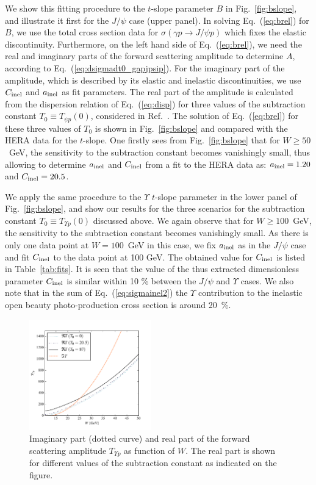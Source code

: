\documentclass[prd,amsmath,%
twocolumn,floatfix,amssymb, preprintnumbers, linenumbers,nofootinbib, superscriptaddress]{revtex4}
\begin{document}
We show this fitting procedure to the $t$-slope parameter $B$ in Fig.~\ref{fig:bslope}, and illustrate it first for the $J/\psi$ case (upper panel). In solving Eq.~(\ref{eq:brel}) for $B$, 
we use the total cross section data for 
$\sigma(\gamma p \to J/\psi p)$ which fixes the elastic discontinuity. Furthermore, on the left hand side of Eq.~(\ref{eq:brel}), we need the real and imaginary parts of the forward scattering amplitude to determine $A$, according to Eq.~(\ref{eq:dsigmadt0_gapjpsip}). 
For the imaginary part of the amplitude, which is described by its elastic and inelastic discontinuities, we use $C_{\rm inel}$ and $a_{\rm inel}$ as fit parameters.   
The real part of the amplitude is calculated from the dispersion relation of Eq.~(\ref{eq:disp}) for three values of the subtraction constant $T_0 \equiv T_{\psi p}(0)$, considered in Ref.~\cite{Gryniuk:2016mpk}. The solution of Eq.~(\ref{eq:brel}) for these three values of $T_0$ is shown in Fig.~\ref{fig:bslope} and compared with the HERA data for the $t$-slope. One firstly sees from Fig.~\ref{fig:bslope} that for $W \geq 50$~GeV, the sensitivity to the subtraction constant becomes vanishingly small, thus allowing to determine $a_{\rm inel}$ and $C_{\rm inel}$ from a fit to the HERA data as: $a_{\rm inel} = 1.20$ and 
$C_{\rm inel} = 20.5$. 


We apply the same procedure to the $\Upsilon$ $t$-slope parameter in the lower panel of Fig.~\ref{fig:bslope}, and  show our results for the three scenarios for the subtraction constant $T_0 \equiv T_{\Upsilon p}(0)$ discussed above. We again observe that for $W \geq 100$~GeV, the sensitivity to the subtraction constant becomes vanishingly small. 
As there is only one data point at $W = 100$~GeV in this case, we fix $a_{\rm inel}$ as in the $J/\psi$ case and fit $C_{\rm inel}$ to the data point at 100 GeV. The obtained value for $C_{\rm inel}$ is listed in Table~\ref{tab:fits}. It is seen that the value of the thus extracted dimensionless parameter $C_{\rm inel}$ is similar within 10 \% between the $J/\psi$ and $\Upsilon$ cases. We also note that in the sum of Eq.~(\ref{eq:sigmainel2}) the $\Upsilon$ contribution  to the inelastic open beauty photo-production cross section is around 20~\%. 

\begin{figure}
\includegraphics[width=0.47\textwidth]{t_y.pdf}
\caption{
Imaginary part (dotted curve) and real part of the forward scattering amplitude $T_{\Upsilon p}$ as function of $W$.
The real part is shown for different values of the subtraction constant as indicated on the figure.
}
\label{fig:psip_psip}
\end{figure}
\end{document}
